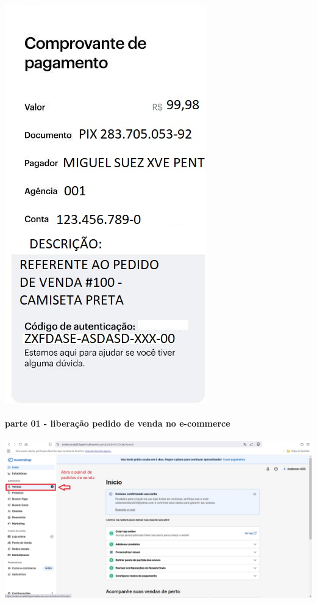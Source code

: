 \documentclass[
]{book}
\begin{document}
\includegraphics{images/np1/104-loja_virtual_cliente_comprovante_pagamento.jpg}

\paragraph{parte 01 - liberação pedido de venda no e-commerce}\label{parte-01---liberauxe7uxe3o-pedido-de-venda-no-e-commerce}

\includegraphics{images/np1/105-loja_virtual_lberar_venda1.jpg}
\end{document}
